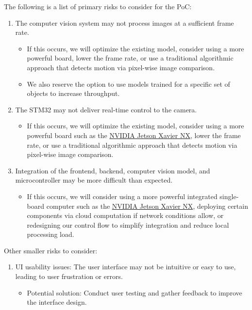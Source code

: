 \documentclass{article}
\begin{document}
The following is a list of primary risks to consider for the PoC:
\begin{enumerate}
  \item The computer vision system may not process images at a sufficient frame rate.
        \begin{itemize}
          \item If this occurs, we will optimize the existing model, consider using a more
                powerful board, lower the frame rate, or use a traditional algorithmic approach
                that detects motion via pixel-wise image comparison.
          \item We also reserve the option to use models trained for a specific set of objects
                to increase throughput.
        \end{itemize}
  \item The STM32 may not deliver real-time control to the camera.
        \begin{itemize}
        \item If this occurs, we will optimize the existing model, consider using a more
            powerful board such as the \href{https://developer.nvidia.com/embedded/jetson-xavier-nx}{NVIDIA Jetson Xavier NX},
            lower the frame rate, or use a traditional algorithmic approach
            that detects motion via pixel-wise image comparison.

        \end{itemize}
  \item Integration of the frontend, backend, computer vision model, and
        microcontroller may be more difficult than expected.
        \begin{itemize}
        \item If this occurs, we will consider using a more powerful integrated single-board
            computer such as the \href{https://developer.nvidia.com/embedded/jetson-xavier-nx}{NVIDIA Jetson Xavier NX},
            deploying certain components via cloud computation if network conditions allow,
            or redesigning our control flow to simplify integration and reduce local processing load.
        \end{itemize}
\end{enumerate}

Other smaller risks to consider:
\begin{enumerate}
  \item UI usability issues: The user interface may not be intuitive or easy to use,
        leading to user frustration or errors.
        \begin{itemize}
          \item {Potential solution}: Conduct user testing and gather feedback to improve the interface design.
        \end{itemize}
\end{enumerate}
\end{document}

